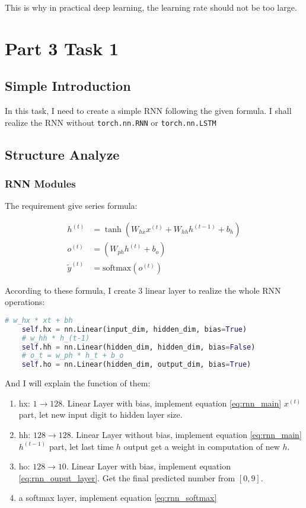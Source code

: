 This is why in practical deep learning, the learning rate should not be too large.

\section{Part 3 Task 1}

\subsection{Simple Introduction}

In this task, I need to create a simple RNN following the given formula.
I shall realize the RNN without \texttt{torch.nn.RNN} or \texttt{torch.nn.LSTM}

\subsection{Structure Analyze}

\subsubsection{RNN Modules}

The requirement give series formula:

\begin{align}
    h^{(t)} &= \tanh{(W_{hx}x^{(t)} + W_{hh}h^{(t-1)} + b_h)} \label{eq:rnn_main} \\ 
    o^{(t)} &= (W_{ph}h^{(t)} + b_o) \label{eq:rnn_ouput_layer} \\ 
    {\tilde{y}^{(t)}} &= \text{softmax}(o^{(t)}) \label{eq:rnn_softmax}
\end{align}

According to these formula, I create 3 linear layer to realize the whole RNN operations:

\begin{lstlisting}[language=Python]
    # w_hx * xt + bh
    self.hx = nn.Linear(input_dim, hidden_dim, bias=True)
    # w_hh * h_(t-1)
    self.hh = nn.Linear(hidden_dim, hidden_dim, bias=False)
    # o_t = w_ph * h_t + b_o
    self.ho = nn.Linear(hidden_dim, output_dim, bias=True)
\end{lstlisting}

And I will explain the function of them:

\begin{enumerate}
    \item hx: $1 \to 128$. Linear Layer with bias, implement equation \ref{eq:rnn_main} $x^{(t)}$ part, let new input digit to hidden layer size.
    \item hh: $128 \to 128$. Linear Layer without bias, implement equation \ref{eq:rnn_main} $h^{(t-1)}$ part, let last time $h$ output get a weight in computation of new $h$.
    \item ho: $128 \to 10$. Linear Layer with bias, implement equation \ref{eq:rnn_ouput_layer}. Get the final predicted number from $[0, 9]$.
    \item a softmax layer, implement equation \ref{eq:rnn_softmax}
\end{enumerate}

